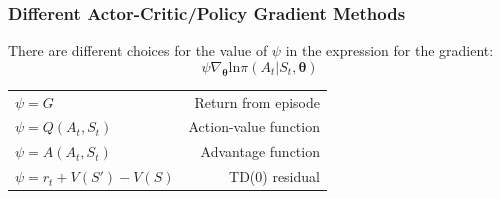 \subsubsection*{Different Actor-Critic/Policy Gradient Methods}
There are different choices for the value of \(\psi\) in the expression for the gradient:
\[
\psi \nabla_{\boldsymbol{\theta}} \text{ln}\pi(A_t|S_t,\boldsymbol{\theta})
\]
\begin{table}[!h]
    \begin{tabular}{lr}
    \(\psi = G\)    &  Return from episode\\
    \(\psi = Q(A_t,S_t)\)     &  Action-value function\\
    \(\psi = A(A_t,S_t)\)     &  Advantage function\\
    \(\psi = r_t + V(S')-V(S)\)     & TD(0) residual
    \end{tabular}
\end{table}
